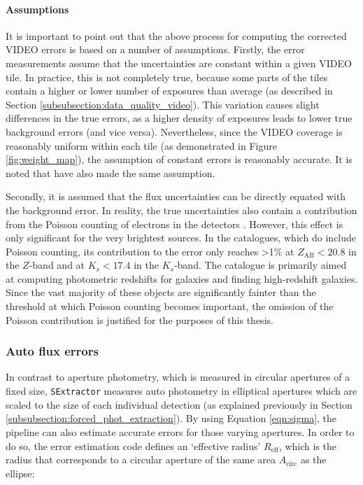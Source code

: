 \paragraph{Assumptions} It is important to point out that the above process for computing the corrected VIDEO errors is based on a number of assumptions. Firstly, the error measurements assume that the uncertainties are constant within a given VIDEO tile. In practice, this is not completely true, because some parts of the tiles contain a higher or lower number of exposures than average (as described in Section \ref{subsubsection:data_quality_video}). This variation causes slight differences in the true errors, as a higher density of exposures leads to lower true background errors (and vice versa). Nevertheless, since the VIDEO coverage is reasonably uniform within each tile (as demonstrated in Figure \ref{fig:weight_map}), the assumption of constant errors is reasonably accurate. It is noted that \cite{2013MNRAS.428.1281J} have also made the same assumption. \par 

Secondly, it is assumed that the flux uncertainties can be directly equated with the background error. In reality, the true uncertainties also contain a contribution from the Poisson counting of electrons in the detectors \citep{2007AJ....134.1103Q}. However, this effect is only significant for the very brightest sources. In the \cite{2013MNRAS.428.1281J} catalogues, which do include Poisson counting, its contribution to the error only reaches >1\% at $Z_{\mathrm{AB}}<20.8$ in the $Z$-band and at $K_{s}<17.4$ in the $K_{s}$-band. The \DESVIDEO catalogue is primarily aimed at computing photometric redshifts for galaxies and finding high-redshift galaxies. Since the vast majority of these objects are significantly fainter than the threshold at which Poisson counting becomes important, the omission of the Poisson contribution is justified for the purposes of this thesis. \par 


%



\subsubsection{Auto flux errors}
In contrast to aperture photometry, which is measured in circular apertures of a fixed size, \texttt{SExtractor} measures auto photometry in elliptical apertures which are scaled to the size of each individual detection (as explained previously in Section \ref{subsubsection:forced_phot_extraction}).  By using Equation \ref{eqn:sigma}, the \DESVIDEO pipeline can also estimate accurate errors for those varying apertures. In order to do so, the error estimation code defines an `effective radius' $R_{\mathrm{eff}}$, which is the radius that corresponds to a circular aperture of the same area $A_{\mathrm{circ}}$ as the ellipse: 

